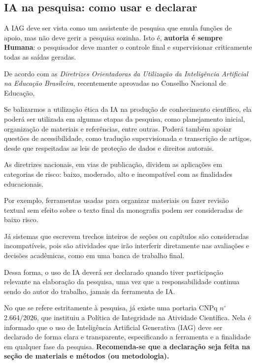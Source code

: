 \documentclass[
	12pt,				%
	openright,			%
	oneside,			%
	a4paper,			%
	english,			%
	brazil				%
	]{abntex2}
\begin{document}
\subsection{IA na pesquisa: como usar e declarar}
A IAG deve ser vista como um assistente de pesquisa que emula funções de apoio, mas não deve gerir a pesquisa sozinha. Isto é, \textbf{autoria é sempre Humana}: o pesquisador deve manter o controle final e supervisionar criticamente todas as saídas geradas.

De acordo com as \emph{Diretrizes Orientadoras da Utilização da Inteligência Artificial na Educação Brasileira}, recentemente aprovadas no Conselho Nacional de Educação, 
 
Se balizarmos a utilização ética da IA na produção de conhecimento científico, ela poderá ser utilizada em algumas etapas da pesquisa, como planejamento inicial, organização de materiais e referências, entre outras. Poderá também 
apoiar questões de acessibilidade, como tradução supervisionada e transcrição de artigos, desde que respeitadas as leis de proteção de dados e direitos autorais. 

As diretrizes nacionais, em vias de publicação, dividem as aplicações em categorias de risco: baixo, moderado, alto  e incompatível com as finalidades educacionais.  

Por exemplo, ferramentas usadas para organizar materiais ou fazer revisão textual sem efeito sobre o texto final da monografia podem ser consideradas de baixo risco.

Já sistemas que escrevem trechos inteiros de seções ou capítulos são consideradas incompatíveis, pois são atividades que irão interferir diretamente nas avaliações e decisões acadêmicas, como em uma banca de trabalho final.

Dessa forma, o uso de IA deverá ser  declarado quando tiver participação relevante na elaboração da pesquisa, uma vez que a responsabilidade continua sendo do autor do trabalho, jamais da ferramenta de IA. 

No que se refere estritamente à pesquisa, já existe uma portaria CNPq $n^{\circ}$ 2.664/2026, que instituiu a Política de Integridade na Atividade Científica. Nela é informado que o uso de Inteligência Artificial Generativa (IAG) deve ser declarado de forma clara e transparente, especificando a ferramenta e a finalidade em qualquer fase da pesquisa. \textbf{Recomenda-se que a declaração seja feita na seção de materiais e métodos (ou metodologia).}
\end{document}
